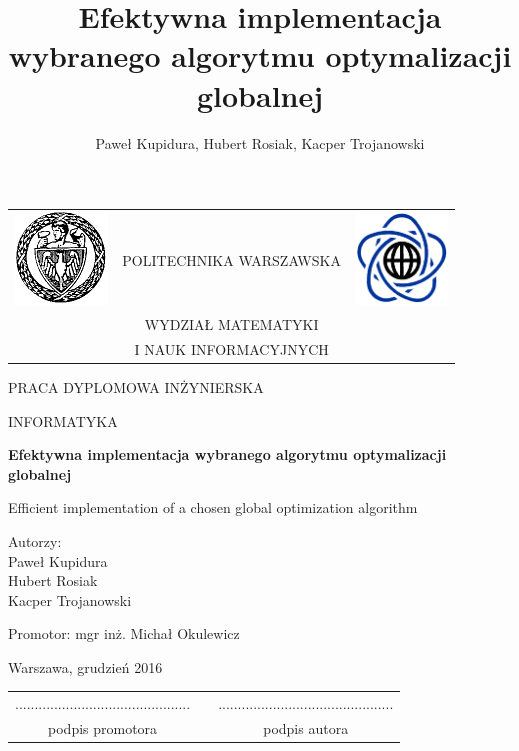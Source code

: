 \documentclass[12pt, twoside, openany, abstract=on]{report}
\author{Paweł Kupidura, Hubert Rosiak, Kacper Trojanowski}
\title{Efektywna implementacja wybranego algorytmu optymalizacji globalnej}
\theoremstyle{definition}
\begin{document}
\begin{titlepage}
\pagestyle{empty}

\noindent
\begin{Large}
\begin{table}[t]
\centering
\begin{tabular}[t]{lcr}
 \includegraphics[width=70pt,height=70pt]{PW} & POLITECHNIKA WARSZAWSKA & \includegraphics[width=70pt,height=70pt]{MiNI}\\
& WYDZIAŁ MATEMATYKI & \\
& I NAUK INFORMACYJNYCH &
\end{tabular}
\end{table}

\begin{center}PRACA DYPLOMOWA INŻYNIERSKA\end{center}
\begin{center}INFORMATYKA\end{center}\end{Large}
\begin{center}
\Huge
\textbf{Efektywna implementacja wybranego algorytmu optymalizacji globalnej}\\
\end{center}

\large Efficient implementation of a chosen global optimization algorithm

\vfill
\begin{center}
\Large
Autorzy:\\
\LARGE
Paweł Kupidura\\
Hubert Rosiak\\
Kacper Trojanowski
\end{center}
\vfill
\begin{center}
\Large
Promotor: mgr inż. Michał Okulewicz
\end{center}
\vfill
\begin{center}
\large
Warszawa, grudzień 2016
\end{center}
\newpage
\hfill
\begin{table}[b]
\centering
\begin{tabular}[t]{ccc}
............................................. & \hspace*{100pt} & .............................................\\
podpis promotora & \hspace*{100pt} & podpis autora
\end{tabular}
\end{table}



\end{titlepage}
\end{document}
